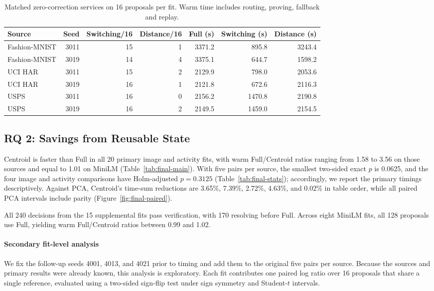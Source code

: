 \documentclass[5p,times,twocolumn]{elsarticle}
\begin{document}
\begin{table}[tbp]
\centering\small
\caption{Matched zero-correction services on 16 proposals per fit.
Warm time includes routing, proving, fallback and replay.}
\label{tab:matched-cap-distance}
\begin{tabular}{@{}lrrrrrr@{}}\toprule
Source & Seed & Switching/16 & Distance/16 & Full (s) & Switching (s) & Distance (s)\\\midrule
Fashion-MNIST & 3011 & 15 & 1 & 3371.2 & 895.8 & 3243.4\\
Fashion-MNIST & 3019 & 14 & 4 & 3375.1 & 644.7 & 1598.2\\
UCI HAR & 3011 & 15 & 2 & 2129.9 & 798.0 & 2053.6\\
UCI HAR & 3019 & 16 & 1 & 2121.8 & 672.6 & 2116.3\\
USPS & 3011 & 16 & 0 & 2156.2 & 1470.8 & 2190.8\\
USPS & 3019 & 16 & 2 & 2149.5 & 1459.0 & 2154.5\\
\bottomrule\end{tabular}
\end{table}


\subsection{RQ 2: Savings from Reusable State}
Centroid is faster than Full in all 20 primary image and activity fits, with warm Full/Centroid ratios ranging from 1.58 to 3.56 on those sources and equal to 1.01 on MiniLM (Table~\ref{tab:final-main}). With five pairs per source, the smallest two-sided exact $p$ is 0.0625, and the four image and activity comparisons have Holm-adjusted $p=0.3125$ (Table~\ref{tab:final-stats}); accordingly, we report the primary timings descriptively. Against PCA, Centroid's time-sum reductions are 3.65\%, 7.39\%, 2.72\%, 4.63\%, and 0.02\% in table order, while all paired PCA intervals include parity (Figure~\ref{fig:final-paired}).

All 240 decisions from the 15 supplemental fits pass verification, with 170 resolving before Full. Across eight MiniLM fits, all 128 proposals use Full, yielding warm Full/Centroid ratios between 0.99 and 1.02.

\paragraph{Secondary fit-level analysis}
We fix the follow-up seeds 4001, 4013, and 4021 prior to timing and add them to the original five pairs per source. Because the sources and primary results were already known, this analysis is exploratory. Each fit contributes one paired log ratio over 16 proposals that share a single reference, evaluated using a two-sided sign-flip test under sign symmetry and Student-$t$ intervals.
\end{document}

